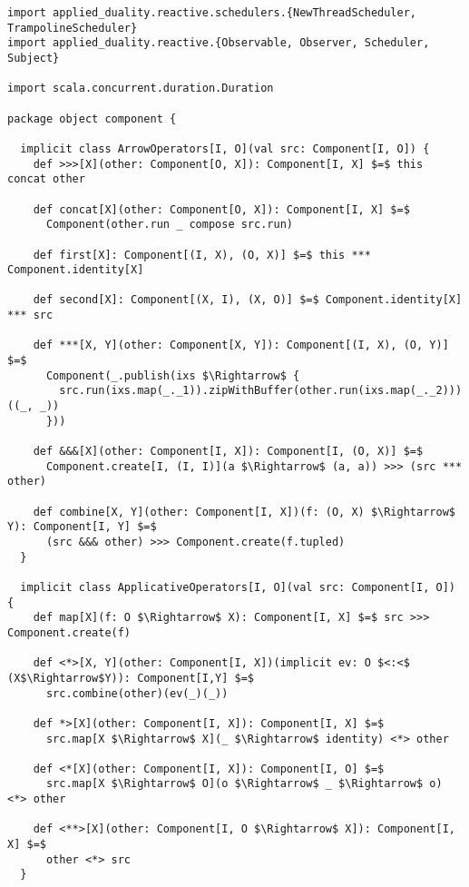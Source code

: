 \hspace*{-\parindent}
\begin{lstlisting}[style=ScalaStyle, caption={Operators on \comp}, label={lst:component-operators}]
import applied_duality.reactive.schedulers.{NewThreadScheduler, TrampolineScheduler}
import applied_duality.reactive.{Observable, Observer, Scheduler, Subject}

import scala.concurrent.duration.Duration

package object component {

  implicit class ArrowOperators[I, O](val src: Component[I, O]) {
    def >>>[X](other: Component[O, X]): Component[I, X] $=$ this concat other

    def concat[X](other: Component[O, X]): Component[I, X] $=$
      Component(other.run _ compose src.run)

    def first[X]: Component[(I, X), (O, X)] $=$ this *** Component.identity[X]

    def second[X]: Component[(X, I), (X, O)] $=$ Component.identity[X] *** src

    def ***[X, Y](other: Component[X, Y]): Component[(I, X), (O, Y)] $=$
      Component(_.publish(ixs $\Rightarrow$ {
        src.run(ixs.map(_._1)).zipWithBuffer(other.run(ixs.map(_._2)))((_, _))
      }))

    def &&&[X](other: Component[I, X]): Component[I, (O, X)] $=$
      Component.create[I, (I, I)](a $\Rightarrow$ (a, a)) >>> (src *** other)

    def combine[X, Y](other: Component[I, X])(f: (O, X) $\Rightarrow$ Y): Component[I, Y] $=$
      (src &&& other) >>> Component.create(f.tupled)
  }

  implicit class ApplicativeOperators[I, O](val src: Component[I, O]) {
    def map[X](f: O $\Rightarrow$ X): Component[I, X] $=$ src >>> Component.create(f)

    def <*>[X, Y](other: Component[I, X])(implicit ev: O $<:<$ (X$\Rightarrow$Y)): Component[I,Y] $=$
      src.combine(other)(ev(_)(_))

    def *>[X](other: Component[I, X]): Component[I, X] $=$
      src.map[X $\Rightarrow$ X](_ $\Rightarrow$ identity) <*> other

    def <*[X](other: Component[I, X]): Component[I, O] $=$
      src.map[X $\Rightarrow$ O](o $\Rightarrow$ _ $\Rightarrow$ o) <*> other

    def <**>[X](other: Component[I, O $\Rightarrow$ X]): Component[I, X] $=$
      other <*> src
  }
  

\end{lstlisting}
